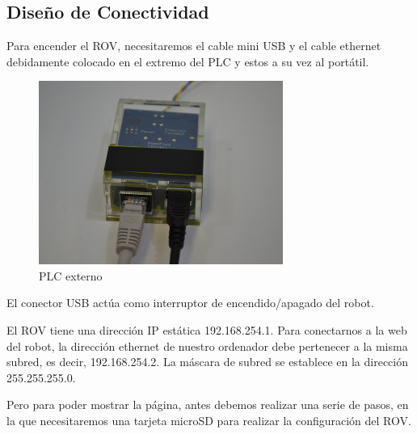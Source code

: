 \subsection{Diseño de Conectividad}
\label{subsec:disenio}

Para encender el ROV, necesitaremos el cable mini USB y el cable ethernet debidamente colocado en el extremo del PLC y estos a su vez al portátil.

\begin{figure} [hbtp]
\begin{center}
  \includegraphics[width=8cm]{img/cap3/3_4/plc_externo}
\end{center}
\caption{PLC externo}
\label{fig:plc_ext}
\end{figure}
  
El conector USB actúa como interruptor de encendido/apagado del robot.

El ROV tiene una dirección IP estática 192.168.254.1. Para conectarnos a la web del robot, la dirección ethernet de nuestro ordenador debe pertenecer a la misma subred, es decir, 192.168.254.2. La máscara de subred se establece en la dirección 255.255.255.0.

Pero para poder mostrar la página, antes debemos realizar una serie de pasos, en la que necesitaremos una tarjeta microSD para realizar la configuración del ROV.
  
